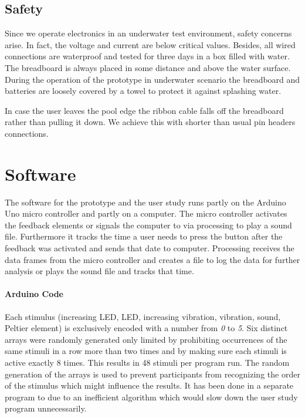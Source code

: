\subsection{Safety}

Since we operate electronics in an underwater test environment, safety concerns arise.
In fact, the voltage and current are below critical values.
Besides, all  wired connections are waterproof and tested for three days in a box filled with water.
The breadboard is always placed in some distance and above the water surface.
During the operation of the prototype in underwater scenario the breadboard and batteries are loosely covered by a towel to protect it against splashing water.

In case the user leaves the pool edge the ribbon cable falls off the breadboard rather than pulling it down. 
We achieve this with shorter than usual pin headers connections.

\section{Software}

The  software for the prototype and the user study runs partly on the Arduino Uno micro controller and partly on a computer.
The micro controller activates the feedback elements or signals the computer to via processing to play a sound file. 
Furthermore it tracks the time a user needs to press the button after the feedback was activated and sends that date to computer.
Processing receives the data frames from the micro controller and creates a file to log the data for further analysis or plays the sound file and tracks that time.

\paragraph{Arduino Code}
Each stimulus (increasing LED, LED, increasing vibration, vibration, sound, Peltier element) is exclusively encoded with a number from \emph{0} to \emph{5}.
Six distinct arrays were randomly generated only limited by prohibiting occurrences of the same stimuli in a row more than two times and by making sure each stimuli is active exactly 8 times.
This results in 48 stimuli per program run.
The random generation of the arrays is used to prevent participants from recognizing the order of the stimulus which might influence the results.
It has been done in a  separate program to due to an inefficient algorithm which would slow down the user study program unnecessarily.

